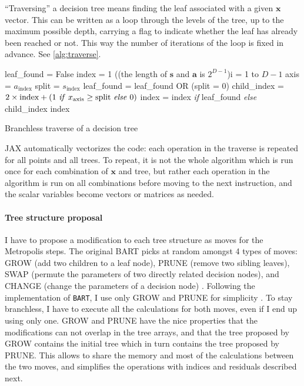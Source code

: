 \documentclass{article}
\begin{document}
    ``Traversing'' a decision tree means finding the leaf associated with a given $\mathbf x$ vector. This can be written as a loop through the levels of the tree, up to the maximum possible depth, carrying a flag to indicate whether the leaf has already been reached or not. This way the number of iterations of the loop is fixed in advance. See \autoref{alg:traverse}.
    \begin{algorithm}[t]
        leaf\_found = False\;
        index = 1\;
        \For(\hfill (the length of $\mathbf s$ and $\mathbf a$ is $2^{D-1}$\text{)}){i = 1 to $D - 1$}{
            axis = $a_\text{index}$\;
            split = $s_\text{index}$\;
            leaf\_found = leaf\_found OR (split = 0)\;
            child\_index = $2 \times \text{index} + (\text{1 \emph{if} $x_\text{axis} \ge \text{split}$ \emph{else} 0})$\;
            index = index \emph{if} leaf\_found \emph{else} child\_index\; 
        }
        \Return index
        \caption{\label{alg:traverse} Branchless traverse of a decision tree}
    \end{algorithm}
    JAX automatically vectorizes the code: each operation in the traverse is repeated for all points and all trees. To repeat, it is not the whole algorithm which is run once for each combination of $\mathbf x$ and tree, but rather each operation in the algorithm is run on all combinations before moving to the next instruction, and the scalar variables become vectors or matrices as needed.

    \paragraph{Tree structure proposal}

    I have to propose a modification to each tree structure as moves for the Metropolis steps. The original BART picks at random amongst 4 types of moves: GROW (add two children to a leaf node), PRUNE (remove two sibling leaves), SWAP (permute the parameters of two directly related decision nodes), and CHANGE (change the parameters of a decision node) \autocite[\S5.1, p.~940]{chipman1998}. Following the implementation of \texttt{BART}, I use only GROW and PRUNE for simplicity \autocite[\S C, p.~57]{sparapani2021}. To stay branchless, I have to execute all the calculations for both moves, even if I end up using only one. GROW and PRUNE have the nice properties that the modifications can not overlap in the tree arrays, and that the tree proposed by GROW contains the initial tree which in turn contains the tree proposed by PRUNE. This allows to share the memory and most of the calculations between the two moves, and simplifies the operations with indices and residuals described next.
\end{document}
